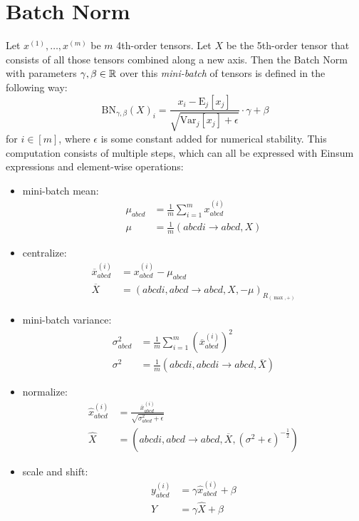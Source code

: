 \section{Batch Norm}
Let $x^{(1)},\dots,x^{(m)}$ be $m$ 4th-order tensors.
Let $X$ be the 5th-order tensor that consists of all those tensors combined along a new axis.
Then the Batch Norm \cite{Ioffe2015} with parameters $\gamma,\beta \in \mathbb{R}$ over this \textit{mini-batch} of tensors is defined in the following way:
$$\text{BN}_{\gamma,\beta}(X)_i = \frac{x_i - \text{E}_j[x_j]}{\sqrt{\text{Var}_j[x_j] + \epsilon}} \cdot \gamma + \beta$$
for $i \in [m]$, where $\epsilon$ is some constant added for numerical stability.
This computation consists of multiple steps, which can all be expressed with Einsum expressions and element-wise operations:
\begin{itemize}
    \item mini-batch mean:
          \begin{align*}
              \mu_{abcd} & = \frac{1}{m} \sum\limits_{i = 1}^{m} x^{(i)}_{abcd} \\
              \mu        & = \frac{1}{m} (abcdi \rightarrow abcd, X)
          \end{align*}
    \item centralize:
          \begin{align*}
              \overline{x}^{(i)}_{abcd} & = x^{(i)}_{abcd} - \mu_{abcd}                            \\
              \overline{X}              & = (abcdi, abcd \rightarrow abcd, X, -\mu)_{R_{(\max,+)}}
          \end{align*}
    \item mini-batch variance:
          \begin{align*}
              \sigma^2_{abcd} & = \frac{1}{m} \sum\limits_{i = 1}^{m} \left(\overline{x}^{(i)}_{abcd}\right)^2 \\
              \sigma^2        & = \frac{1}{m} (abcdi,abcdi \rightarrow abcd, \overline{X})
          \end{align*}
    \item normalize:
          \begin{align*}
              \hat{x}^{(i)}_{abcd} & = \frac{\overline{x}^{(i)}_{abcd}}{\sqrt{\sigma^2_{abcd} + \epsilon}}                \\
              \hat{X}              & = (abcdi, abcd \rightarrow abcd, \overline{X}, (\sigma^2 + \epsilon)^{-\frac{1}{2}})
          \end{align*}
    \item scale and shift:
          \begin{align*}
              y^{(i)}_{abcd} & = \gamma \hat{x}^{(i)}_{abcd} + \beta \\
              Y              & = \gamma \hat{X} + \beta
          \end{align*}
\end{itemize}

